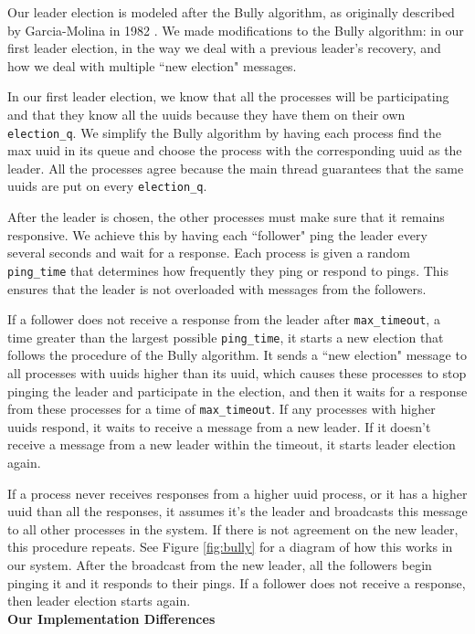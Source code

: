 \documentclass[preprint,review,12pt]{cs262}
\begin{document}
Our leader election is modeled after the Bully algorithm, as originally described by Garcia-Molina in 1982 \cite{garcia1982elections}. We made modifications to the Bully algorithm: in our first leader election, in the way we deal with a previous leader's recovery, and how we deal with multiple ``new election" messages.

In our first leader election, we know that all the processes will be participating and that they know all the uuids because they have them on their own \texttt{election\_q}. We simplify the Bully algorithm by having each process find the max uuid in its queue and choose the process with the corresponding uuid as the leader. All the processes agree because the main thread guarantees that the same uuids are put on every \texttt{election\_q}.

After the leader is chosen, the other processes must make sure that it remains responsive. We achieve this by having each ``follower" ping the leader every several seconds and wait for a response. Each process is given a random \texttt{ping\_time} that determines how frequently they ping or respond to pings. This ensures that the leader is not overloaded with messages from the followers.

If a follower does not receive a response from the leader after \texttt{max\_timeout}, a time greater than the largest possible \texttt{ping\_time}, it starts a new election that follows the procedure of the Bully algorithm. It sends a ``new election" message to all processes with uuids higher than its uuid, which causes these processes to stop pinging the leader and participate in the election, and then it waits for a response from these processes for a time of \texttt{max\_timeout}. If any processes with higher uuids respond, it waits to receive a message from a new leader. If it doesn't receive a message from a new leader within the timeout, it starts leader election again. 

If a process never receives responses from a higher uuid process, or it has a higher uuid than all the responses, it assumes it's the leader and broadcasts this message to all other processes in the system. If there is not agreement on the new leader, this procedure repeats. See Figure \ref{fig:bully} for a diagram of how this works in our system. After the broadcast from the new leader, all the followers begin pinging it and it responds to their pings. If a follower does not receive a response, then leader election starts again.\\ \textbf{Our Implementation Differences}
\end{document}
